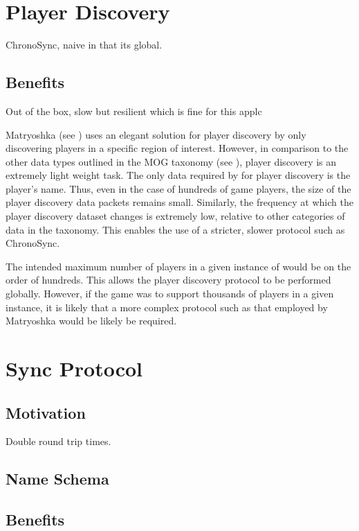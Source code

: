 \section{Player Discovery}
ChronoSync, naive in that its global. 
\subsection{Benefits}
Out of the box, slow but resilient which is fine for this applc

Matryoshka (see ) uses an elegant solution for player discovery by only discovering players in a specific region of interest. However, in comparison to the other data types outlined in the MOG taxonomy (see ), player discovery is an extremely light weight task. The only data required by \game{} for player discovery is the player's name. Thus, even in the case of hundreds of game players, the size of the player discovery data packets remains small. Similarly, the frequency at which the player discovery dataset changes is extremely low, relative to other categories of data in the taxonomy. This enables the use of a stricter, slower protocol such as ChronoSync. 

The intended maximum number of players in a given instance of \game{} would be on the order of hundreds. This allows the player discovery protocol to be performed globally. However, if the game was to support thousands of players in a given instance, it is likely that a more complex protocol such as that employed by Matryoshka would be likely be required. 


\section{\game{} Sync Protocol}
\subsection{Motivation}
Double round trip times.
\subsection{Name Schema}
\subsection{Benefits}


